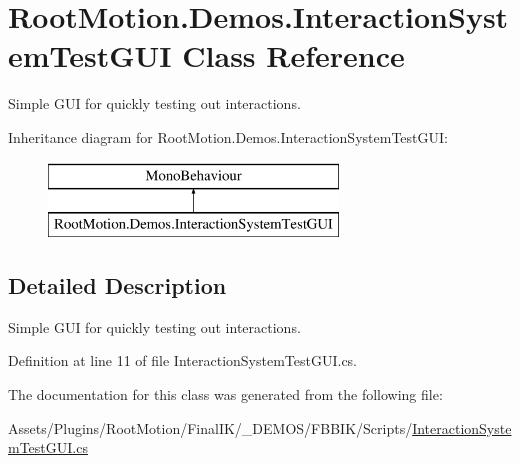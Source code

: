 \hypertarget{class_root_motion_1_1_demos_1_1_interaction_system_test_g_u_i}{}\section{Root\+Motion.\+Demos.\+Interaction\+System\+Test\+G\+UI Class Reference}
\label{class_root_motion_1_1_demos_1_1_interaction_system_test_g_u_i}


Simple G\+UI for quickly testing out interactions.  


Inheritance diagram for Root\+Motion.\+Demos.\+Interaction\+System\+Test\+G\+UI\+:\begin{figure}[H]
\begin{center}
\leavevmode
\includegraphics[height=2.000000cm]{class_root_motion_1_1_demos_1_1_interaction_system_test_g_u_i}
\end{center}
\end{figure}


\subsection{Detailed Description}
Simple G\+UI for quickly testing out interactions. 



Definition at line 11 of file Interaction\+System\+Test\+G\+U\+I.\+cs.



The documentation for this class was generated from the following file\+:\begin{DoxyCompactItemize}
\item 
Assets/\+Plugins/\+Root\+Motion/\+Final\+I\+K/\+\_\+\+D\+E\+M\+O\+S/\+F\+B\+B\+I\+K/\+Scripts/\mbox{\hyperlink{_interaction_system_test_g_u_i_8cs}{Interaction\+System\+Test\+G\+U\+I.\+cs}}\end{DoxyCompactItemize}
